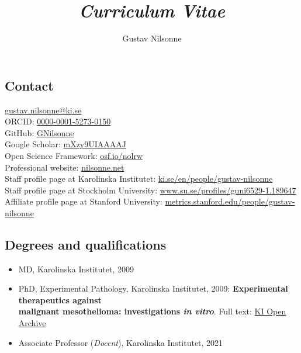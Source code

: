 \documentclass[10pt]{article}
\begin{document}
\title{\emph{Curriculum Vitae}}

\author{Gustav Nilsonne}

\maketitle

\subsection*{Contact}
\href{mailto:gustav.nilsonne@ki.se}{gustav.nilsonne@ki.se}\\
ORCID: \href{http://orcid.org/0000-0001-5273-0150}{0000-0001-5273-0150}\\
GitHub: \href{https://github.com/GNilsonne}{GNilsonne}\\
Google Scholar: \href{https://scholar.google.com/citations?user=mXzy9UIAAAAJ}{mXzy9UIAAAAJ}\\
Open Science Framework: \href{https://osf.io/nolrw}{osf.io/nolrw}\\
Professional website: \href{http://nilsonne.net}{nilsonne.net}\\
Staff profile page at Karolinska Institutet: \href{https://ki.se/en/people/gustav-nilsonne}{ki.se/en/people/gustav-nilsonne}\\
Staff profile page at Stockholm University: \href{https://www.su.se/profiles/guni6529-1.189647}{www.su.se/profiles/guni6529-1.189647}\\
Affiliate profile page at Stanford University: \href{https://metrics.stanford.edu/people/gustav-nilsonne}{metrics.stanford.edu/people/gustav-nilsonne}

\subsection*{Degrees and qualifications}
\begin{itemize}[nolistsep]
\item MD, Karolinska Institutet, 2009
\item PhD, Experimental Pathology, Karolinska Institutet, 2009: \textbf{Experimental therapeutics against \\ malignant mesothelioma: investigations \textit{in vitro}}. 
Full text: \href{https://openarchive.ki.se/xmlui/handle/10616/38731}{KI Open Archive}
\item Associate Professor (\emph{Docent}), Karolinska Institutet, 2021
\end{itemize}
\end{document}
